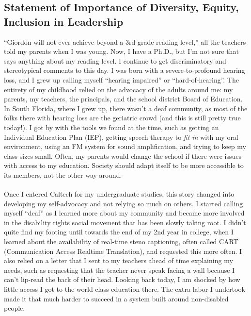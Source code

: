 \subsection{Statement of Importance of Diversity, Equity, Inclusion in Leadership} \label{ssec:statement-of-importance-of-diversity-equity-inclusion-in-leadership}

\enquote{Giordon will not ever achieve beyond a 3rd-grade reading level,} all the teachers told my parents when I was young. Now, I have a Ph.D., but I'm not sure that says anything about my reading level. I continue to get discriminatory and stereotypical comments to this day. I was born with a severe-to-profound hearing loss, and I grew up calling myself \enquote{hearing impaired} or \enquote{hard-of-hearing}. The entirety of my childhood relied on the advocacy of the adults around me: my parents, my teachers, the principals, and the school district Board of Education. In South Florida, where I grew up, there wasn't a deaf community, as most of the folks there with hearing loss are the geriatric crowd (and this is still pretty true today!). I got by with the tools we found at the time, such as getting an Individual Education Plan (IEP), getting speech therapy to \textsl{fit in} with my oral environment, using an FM system for sound amplification, and trying to keep my class sizes small. Often, my parents would change the school if there were issues with access to my education. Society should adapt itself to be more accessible to its members, not the other way around.
\\
\\
Once I entered Caltech for my undergraduate studies, this story changed into developing my self-advocacy and not relying so much on others. I started calling myself \enquote{deaf} as I learned more about my community and became more involved in the disability rights social movement that has been slowly taking root. I didn't quite find my footing until towards the end of my 2nd year in college, when I learned about the availability of real-time steno captioning, often called CART (Communication Access Realtime Translation), and requested this more often. I also relied on a letter that I sent to my teachers ahead of time explaining my needs, such as requesting that the teacher never speak facing a wall because I can't lip-read the back of their head. Looking back today, I am shocked by how little access I got to the world-class education there. The extra labor I undertook made it that much harder to succeed in a system built around non-disabled people.

